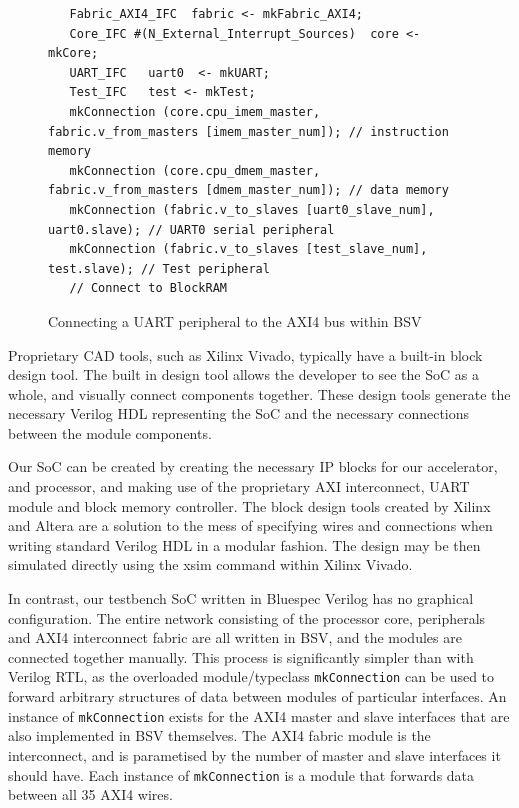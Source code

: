 \documentclass[a4paper,8pt]{report}
\begin{document}
\begin{figure}[h]
  \scriptsize
\begin{verbatim}
   Fabric_AXI4_IFC  fabric <- mkFabric_AXI4;
   Core_IFC #(N_External_Interrupt_Sources)  core <- mkCore;
   UART_IFC   uart0  <- mkUART;
   Test_IFC   test <- mkTest;
   mkConnection (core.cpu_imem_master,  fabric.v_from_masters [imem_master_num]); // instruction memory
   mkConnection (core.cpu_dmem_master,  fabric.v_from_masters [dmem_master_num]); // data memory
   mkConnection (fabric.v_to_slaves [uart0_slave_num],  uart0.slave); // UART0 serial peripheral
   mkConnection (fabric.v_to_slaves [test_slave_num],  test.slave); // Test peripheral
   // Connect to BlockRAM
\end{verbatim}
  \normalsize
  \caption{Connecting a UART peripheral to the AXI4 bus within BSV}
\end{figure}


Proprietary CAD tools, such as Xilinx Vivado, typically have a built-in block
design tool. The built in design tool allows the developer to see the SoC as a
whole, and visually connect components together. These design tools generate the
necessary Verilog HDL representing the SoC and the necessary connections between
the module components.

Our SoC can be created by creating the necessary IP blocks for our accelerator,
and processor, and making use of the proprietary AXI interconnect, UART module
and block memory controller. The block design tools created by Xilinx and Altera
are a solution to the mess of specifying wires and connections when writing
standard Verilog HDL in a modular fashion. The design may be then simulated
directly using the xsim command within Xilinx Vivado.

In contrast, our testbench SoC written in Bluespec Verilog has no graphical
configuration. The entire network consisting of the processor core, peripherals
and AXI4 interconnect fabric are all written in BSV, and the modules are
connected together manually. This process is significantly simpler than with
Verilog RTL, as the overloaded module/typeclass \texttt{mkConnection} can be used to
forward arbitrary structures of data between modules of particular interfaces.
An instance of \texttt{mkConnection} exists for the AXI4 master and slave
interfaces that are also implemented in BSV themselves. The AXI4 fabric module
is the interconnect, and is parametised by the number of master and slave
interfaces it should have. Each instance of \texttt{mkConnection} is a module
that forwards data between all 35 AXI4 wires.
\clearpage
\end{document}

